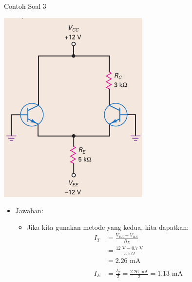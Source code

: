 \documentclass[aspectratio=169]{beamer}
\begin{document}
\begin{frame}{Contoh Soal 3}
	\begin{multicols}{2}
		\begin{center}
			\includegraphics[width=0.6\textheight]{gambar/01.latihan_soal_3}
		\end{center}
		\columnbreak
		\begin{itemize}
			\item Jawaban:
			\begin{itemize}
				\item Jika kita gunakan metode yang kedua, kita dapatkan:
				\begin{align*}
					I_T &= \frac{V_{EE} - V_{BE}}{R_E} \\
					&= \frac{12 \text{ V} - 0.7 \text{ V}}{5 \text{ k}\Omega} \\
					&= 2.26 \text{ mA} \\
					\\
					I_E &= \frac{I_T}{2} = \frac{2.26 \text{ mA}}{2} = 1.13 \text{ mA}
				\end{align*}
			\end{itemize}
		\end{itemize}
		\vfill\null
	\end{multicols}
\end{frame}
\end{document}
